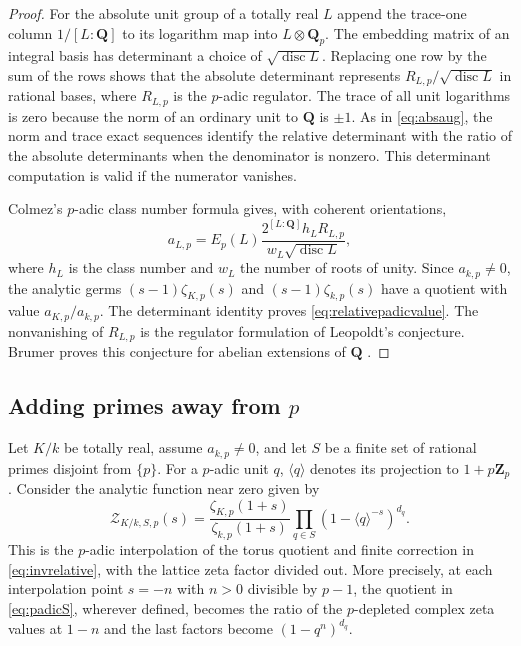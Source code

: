 \documentclass[11pt]{amsart}
\numberwithin{equation}{section}
\theoremstyle{definition}
\theoremstyle{remark}
\newcommand{\Q}{\mathbf Q}
\newcommand{\Z}{\mathbf Z}
\begin{document}
\begin{proof}
For the absolute unit group of a totally real $L$ append
the trace-one column $1/[L:\Q]$ to its logarithm map into
$L\otimes\Q_p$. The embedding matrix of an integral basis
has determinant a choice of $\sqrt{\operatorname{disc}L}$.
Replacing one row by the sum of the rows shows that the
absolute determinant represents
$R_{L,p}/\sqrt{\operatorname{disc}L}$ in rational bases, where
$R_{L,p}$ is the $p$-adic regulator. The trace of all unit
logarithms is zero because the norm of an ordinary unit to
$\Q$ is $\pm1$. As in \eqref{eq:absaug}, the norm and trace
exact sequences identify the relative determinant with
the ratio of the absolute determinants when the denominator
is nonzero. This determinant computation is valid if the
numerator vanishes.

Colmez's $p$-adic class number formula
\cite[pp.~371--372]{Colmez} gives, with coherent orientations,
\[
 a_{L,p}=E_p(L)
 \frac{2^{[L:\Q]}h_L R_{L,p}}
      {w_L\sqrt{\operatorname{disc}L}},
\]
where $h_L$ is the class number and $w_L$ the number of roots
of unity. Since $a_{k,p}\ne0$, the analytic germs
$(s-1)\zeta_{K,p}(s)$ and $(s-1)\zeta_{k,p}(s)$ have a
quotient with value $a_{K,p}/a_{k,p}$. The determinant
identity proves \eqref{eq:relativepadicvalue}. The
nonvanishing of $R_{L,p}$ is the regulator formulation
of Leopoldt's conjecture. Brumer proves this conjecture
for abelian extensions of $\Q$ \cite{Brumer}.
\end{proof}

\subsection{Adding primes away from \texorpdfstring{$p$}{p}}

Let $K/k$ be totally real, assume $a_{k,p}\ne0$, and
let $S$ be a finite set of rational primes disjoint from
$\{p\}$. For a $p$-adic unit $q$, $\langle q\rangle$
denotes its projection to $1+p\Z_p$. Consider the
analytic function near zero given by
\begin{equation}\label{eq:padicS}
 \mathcal Z_{K/k,S,p}(s)=
 \frac{\zeta_{K,p}(1+s)}{\zeta_{k,p}(1+s)}
 \prod_{q\in S}(1-\langle q\rangle^{-s})^{d_q}.
\end{equation}
This is the $p$-adic interpolation of the torus
quotient and finite correction in \eqref{eq:invrelative},
with the lattice zeta factor divided out. More precisely,
at each interpolation point $s=-n$ with $n>0$ divisible by $p-1$,
the quotient in \eqref{eq:padicS}, wherever defined, becomes the ratio of
the $p$-depleted complex zeta values at $1-n$ and the
last factors become $(1-q^n)^{d_q}$.
\end{document}
